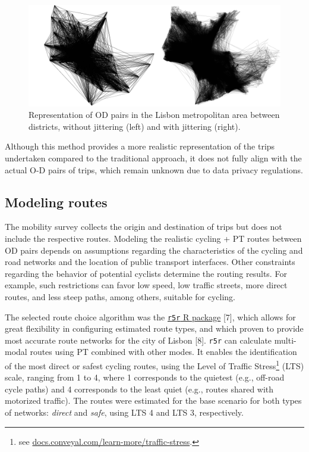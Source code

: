 \documentclass[runningheads]{llncs}
\begin{document}
\begin{figure}

{\centering \includegraphics[width=1\linewidth,]{img/jitter} 

}

\caption{Representation of OD pairs in the Lisbon metropolitan area between districts, without jittering (left) and with jittering (right).}\label{fig:jitter}
\end{figure}

Although this method provides a more realistic representation of the
trips undertaken compared to the traditional approach, it does not fully
align with the actual O-D pairs of trips, which remain unknown due to
data privacy regulations.

\hypertarget{modeling-routes}{%
\subsection{Modeling routes}\label{modeling-routes}}

The mobility survey collects the origin and destination of trips but
does not include the respective routes. Modeling the realistic cycling +
PT routes between OD pairs depends on assumptions regarding the
characteristics of the cycling and road networks and the location of
public transport interfaces. Other constraints regarding the behavior of
potential cyclists determine the routing results. For example, such
restrictions can favor low speed, low traffic streets, more direct
routes, and less steep paths, among others, suitable for cycling.

The selected route choice algorithm was the
\href{https://ipeagit.github.io/r5r/}{\texttt{r5r} R package} {[}7{]},
which allows for great flexibility in configuring estimated route types,
and which proven to provide most accurate route networks for the city of
Lisbon {[}8{]}. \texttt{r5r} can calculate multi-modal routes using PT
combined with other modes. It enables the identification of the most
direct or safest cycling routes, using the Level of Traffic
Stress\footnote{see
  \href{https://docs.conveyal.com/learn-more/traffic-stress}{docs.conveyal.com/learn-more/traffic-stress}.}
(LTS) scale, ranging from 1 to 4, where 1 corresponds to the quietest
(e.g., off-road cycle paths) and 4 corresponds to the least quiet (e.g.,
routes shared with motorized traffic). The routes were estimated for the
base scenario for both types of networks: \emph{direct} and \emph{safe},
using LTS 4 and LTS 3, respectively.
\end{document}
